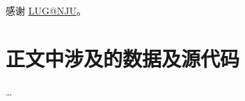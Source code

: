 \documentclass[
  ]{njuthesis}
\begin{document}

\printbibliography


\begin{acknowledgement}
  感谢 \href{https://git.nju.edu.cn/nju-lug/lug-introduction}{LUG@NJU}。
\end{acknowledgement}




\appendix

\chapter{正文中涉及的数据及源代码}
\dots

\end{document}
